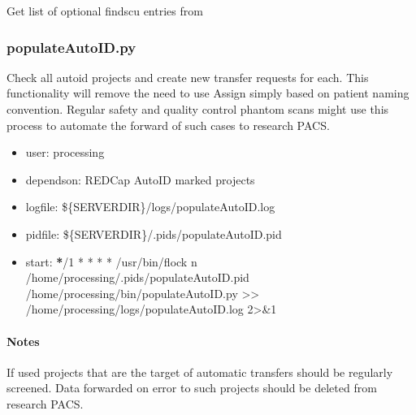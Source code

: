 \documentclass[letterpaper,10pt,english]{sphinxmanual}
\begin{document}
\sphinxAtStartPar
Get list of optional findscu entries from 

\sphinxstepscope


\subsubsection{populateAutoID.py}
\label{\detokenize{Architecture/scripts/populateAutoID:populateautoid-py}}\label{\detokenize{Architecture/scripts/populateAutoID::doc}}
\sphinxAtStartPar
Check all auto\sphinxhyphen{}id projects and create new transfer requests for each. This functionality will remove the need to use Assign simply based on patient naming convention. Regular safety and quality control phantom scans might use this process to automate the forward of such cases to research PACS.
\begin{itemize}
\item {} 
\sphinxAtStartPar
user: processing

\item {} 
\sphinxAtStartPar
depends\sphinxhyphen{}on:
\sphinxhyphen{} REDCap AutoID marked projects

\item {} 
\sphinxAtStartPar
log\sphinxhyphen{}file:
\sphinxhyphen{} \$\{SERVERDIR\}/logs/populateAutoID.log

\item {} 
\sphinxAtStartPar
pid\sphinxhyphen{}file: \$\{SERVERDIR\}/.pids/populateAutoID.pid

\item {} 
\sphinxAtStartPar
start:
{\color{red}\bfseries{}*}/1 * * * *  /usr/bin/flock \sphinxhyphen{}n /home/processing/.pids/populateAutoID.pid /home/processing/bin/populateAutoID.py \textgreater{}\textgreater{} /home/processing/logs/populateAutoID.log 2\textgreater{}\&1

\end{itemize}


\paragraph{Notes}
\label{\detokenize{Architecture/scripts/populateAutoID:notes}}
\sphinxAtStartPar
If used projects that are the target of automatic transfers should be regularly screened. Data forwarded on error to such projects should be deleted from research PACS.

\sphinxstepscope
\end{document}
